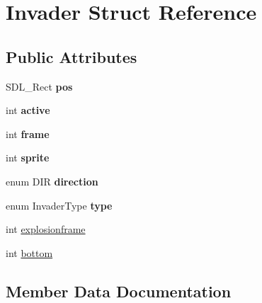 \hypertarget{structInvader}{}\section{Invader Struct Reference}
\label{structInvader}
\subsection*{Public Attributes}
\begin{DoxyCompactItemize}
\item 
\hypertarget{structInvader_aa2028665eb1a567b754596ea72e76855}{}S\+D\+L\+\_\+\+Rect {\bfseries pos}\label{structInvader_aa2028665eb1a567b754596ea72e76855}

\item 
\hypertarget{structInvader_a580b5e71be118589c12e819ecf26960b}{}int {\bfseries active}\label{structInvader_a580b5e71be118589c12e819ecf26960b}

\item 
\hypertarget{structInvader_a7b64aebf3ef230739d88d9d9ab4a97b8}{}int {\bfseries frame}\label{structInvader_a7b64aebf3ef230739d88d9d9ab4a97b8}

\item 
\hypertarget{structInvader_aac6c3cdde54b3cbe109fd5c7e2e5ae90}{}int {\bfseries sprite}\label{structInvader_aac6c3cdde54b3cbe109fd5c7e2e5ae90}

\item 
\hypertarget{structInvader_a9c793a2a19e4e8ff468a8d80a2c5beff}{}enum D\+I\+R {\bfseries direction}\label{structInvader_a9c793a2a19e4e8ff468a8d80a2c5beff}

\item 
\hypertarget{structInvader_a437fdaa14fea0e892e79ab6fe94fd120}{}enum Invader\+Type {\bfseries type}\label{structInvader_a437fdaa14fea0e892e79ab6fe94fd120}

\item 
int \hyperlink{structInvader_aa09d48ba0bdf587a6532711c226594c7}{explosionframe}
\item 
int \hyperlink{structInvader_ae58a7596b4a32ba1f3a23941b1fc6995}{bottom}
\end{DoxyCompactItemize}


\subsection{Member Data Documentation}
\hypertarget{structInvader_ae58a7596b4a32ba1f3a23941b1fc6995}{}
